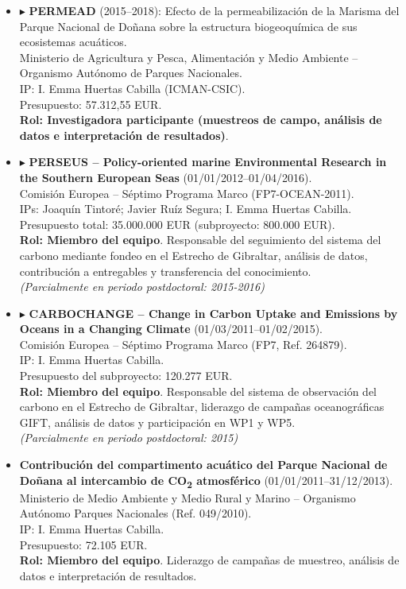 \documentclass[11pt,a4paper]{article}
\begin{document}
\begin{itemize}[leftmargin=*]
    \item $\blacktriangleright$ \textbf{PERMEAD} (2015--2018): 
    Efecto de la permeabilización de la Marisma del Parque Nacional de Doñana sobre la estructura biogeoquímica de sus ecosistemas acuáticos.\\
    Ministerio de Agricultura y Pesca, Alimentación y Medio Ambiente – Organismo Autónomo de Parques Nacionales.\\
    IP: I. Emma Huertas Cabilla (ICMAN-CSIC).\\
    Presupuesto: 57.312,55 EUR.\\
    \textbf{Rol: Investigadora participante (muestreos de campo, análisis de datos e interpretación de resultados)}.
\item $\blacktriangleright$ \textbf{PERSEUS – Policy-oriented marine Environmental Research in the Southern European Seas} (01/01/2012--01/04/2016).\\
    Comisión Europea – Séptimo Programa Marco (FP7-OCEAN-2011).\\
    IPs: Joaquín Tintoré; Javier Ruíz Segura; I. Emma Huertas Cabilla.\\
    Presupuesto total: 35.000.000 EUR (subproyecto: 800.000 EUR).\\
    \textbf{Rol: Miembro del equipo}. Responsable del seguimiento del sistema del carbono mediante fondeo en el Estrecho de Gibraltar, análisis de datos, contribución a entregables y transferencia del conocimiento.\\
    \textit{\small (Parcialmente en periodo postdoctoral: 2015-2016)}

    \item $\blacktriangleright$ \textbf{CARBOCHANGE – Change in Carbon Uptake and Emissions by Oceans in a Changing Climate} (01/03/2011--01/02/2015).\\
    Comisión Europea – Séptimo Programa Marco (FP7, Ref. 264879).\\
    IP: I. Emma Huertas Cabilla.\\
    Presupuesto del subproyecto: 120.277 EUR.\\
    \textbf{Rol: Miembro del equipo}. Responsable del sistema de observación del carbono en el Estrecho de Gibraltar, liderazgo de campañas oceanográficas GIFT, análisis de datos y participación en WP1 y WP5.\\
    \textit{\small (Parcialmente en periodo postdoctoral: 2015)}

    \item \textbf{Contribución del compartimento acuático del Parque Nacional de Doñana al intercambio de CO\textsubscript{2} atmosférico} (01/01/2011--31/12/2013).\\
    Ministerio de Medio Ambiente y Medio Rural y Marino – Organismo Autónomo Parques Nacionales (Ref. 049/2010).\\
    IP: I. Emma Huertas Cabilla.\\
    Presupuesto: 72.105 EUR.\\
    \textbf{Rol: Miembro del equipo}. Liderazgo de campañas de muestreo, análisis de datos e interpretación de resultados.


\end{itemize}
\end{document}
